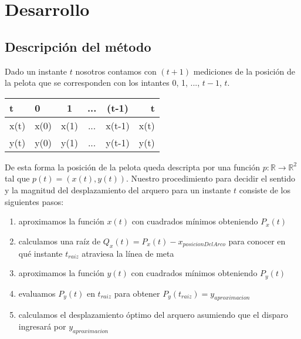 \section{Desarrollo}

\subsection{Descripción del método}
Dado un instante $t$ nosotros contamos con $(t+1)$ mediciones de la posición de la pelota que se corresponden con los intantes 
0, 1, ..., $t-1$, $t$. 
\begin{center}
  \begin{tabular}{l | l*{3}{c}r}
  t              & 0 & 1 & ... & (t-1) & t\\
  \hline
  x(t)	       & x(0) & x(1) & ... & x(t-1) & x(t)\\
  \hline
  y(t)	       & y(0) & y(1) & ... & y(t-1) & y(t)\\
  \end{tabular} 
\end{center}
De esta forma la posición de la pelota queda descripta por una función $p:\mathbb{R} \to \mathbb{R}^2$ tal que $p(t) = (x(t),y(t))$.
Nuestro procedimiento para decidir el sentido y la magnitud del desplazamiento del arquero para un instante $t$ consiste de los siguientes
pasos:
\begin{enumerate}
 \item aproximamos la función $x(t)$ con cuadrados mínimos obteniendo $P_x(t)$
 \item calculamos una raíz de $Q_x(t) = P_x(t) - x_{posicionDelArco}$ para conocer en qué instante $t_{raiz}$ atraviesa la línea de meta
 \item aproximamos la función $y(t)$ con cuadrados mínimos obteniendo $P_y(t)$
 \item evaluamos $P_y(t)$ en $t_{raiz}$ para obtener $P_y(t_{raiz}) = y_{aproximacion}$
 \item calculamos el desplazamiento óptimo del arquero asumiendo que el disparo ingresará por $y_{aproximacion}$
\end{enumerate}

